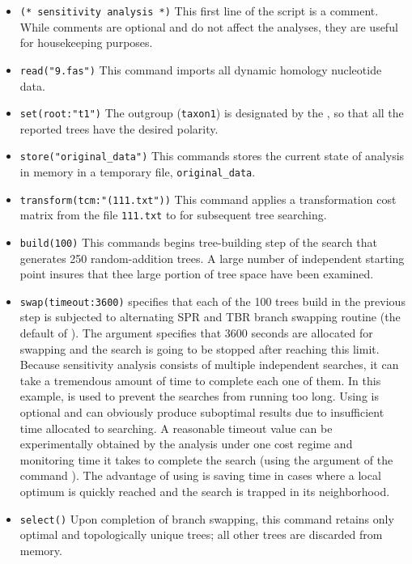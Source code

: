 \begin{itemize}
\item \texttt{(* sensitivity analysis *)} This first line of the script is a comment. While comments are optional and do not
 affect the analyses, they are useful for housekeeping purposes.
\item \texttt{read("9.fas")} This command imports all dynamic homology nucleotide data.
\item \texttt{set(root:"t1")} The outgroup (\texttt{taxon1}) is designated by the , so that all the 
reported trees have the desired polarity.
\item \texttt{store("original\_data")} This commands stores the current state of analysis in memory in a temporary file, 
\texttt{original\_data}.
\item \texttt{transform(tcm:"(111.txt"))} This command applies a transformation cost matrix from the file \texttt{111.txt} to 
for subsequent tree searching.
\item \texttt{build(100)} This commands begins tree-building step of the search that generates 250 random-addition 
trees. A large number of independent starting point insures that thee large portion of tree space have been 
examined.
\item \texttt{swap(timeout:3600)}  specifies that each of the 100 trees build in the previous step is 
subjected to alternating SPR and TBR branch swapping routine (the default of \poy). The argument 
 specifies that 3600 seconds are allocated for swapping and the search is going to be stopped 
after reaching this limit. Because sensitivity analysis consists of multiple independent searches, it can take a 
tremendous amount of time to complete each one of them. In this example,  is used to prevent 
the searches from running too long. Using  is optional and can obviously produce suboptimal 
results due to insufficient time allocated to searching. A reasonable timeout value can be experimentally obtained by 
the analysis under one cost regime and monitoring time it takes to complete the search (using the argument 
 of the command ). The advantage of using  is saving 
time in cases where a local optimum is quickly reached and the search is trapped in its neighborhood.
\item \texttt{select()} Upon completion of branch swapping, this command retains only optimal and topologically 
unique trees; all other trees are discarded from memory.

\end{itemize}
